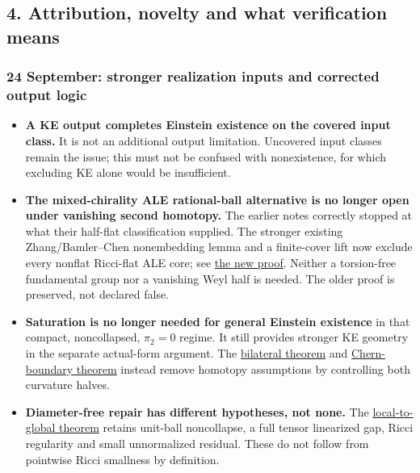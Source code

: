 \documentclass[
  10pt,
]{article}
\providecommand{\tightlist}{%
  \setlength{\itemsep}{0pt}\setlength{\parskip}{0pt}}
\begin{document}
\hypertarget{attribution-novelty-and-what-verification-means}{%
\subsection{4. Attribution, novelty and what verification
means}\label{attribution-novelty-and-what-verification-means}}

\hypertarget{september-stronger-realization-inputs-and-corrected-output-logic}{%
\subsubsection{24 September: stronger realization inputs and corrected
output
logic}\label{september-stronger-realization-inputs-and-corrected-output-logic}}

\begin{itemize}
\tightlist
\item
  \textbf{A KE output completes Einstein existence on the covered input
  class.} It is not an additional output limitation. Uncovered input
  classes remain the issue; this must not be confused with nonexistence,
  for which excluding KE alone would be insufficient.
\item
  \textbf{The mixed-chirality ALE rational-ball alternative is no longer
  open under vanishing second homotopy.} The earlier notes correctly
  stopped at what their half-flat classification supplied. The stronger
  existing Zhang/Bamler--Chen nonembedding lemma and a finite-cover lift
  now exclude every nonflat Ricci-flat ALE core; see
  \href{../continuation/20260924_ale_boundary_compatibility.md}{the new
  proof}. Neither a torsion-free fundamental group nor a vanishing Weyl
  half is needed. The older proof is preserved, not declared false.
\item
  \textbf{Saturation is no longer needed for general Einstein existence}
  in that compact, noncollapsed, \(\pi_2=0\) regime. It still provides
  stronger KE geometry in the separate actual-form argument. The
  \href{../continuation/20260924_bilateral_realization.md}{bilateral
  theorem} and
  \href{../continuation/20260924_chern_boundary_realization.md}{Chern-boundary
  theorem} instead remove homotopy assumptions by controlling both
  curvature halves.
\item
  \textbf{Diameter-free repair has different hypotheses, not none.} The
  \href{../continuation/20260924_local_to_global_scope.md}{local-to-global
  theorem} retains unit-ball noncollapse, a full tensor linearized gap,
  Ricci regularity and small unnormalized residual. These do not follow
  from pointwise Ricci smallness by definition.
\end{itemize}
\end{document}
